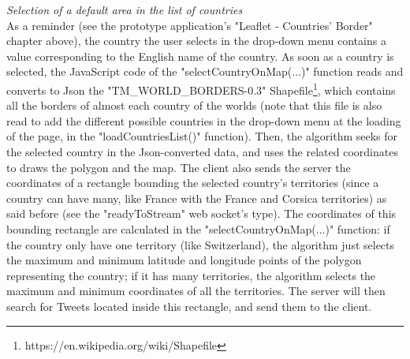 \documentclass[a4paper,11pt]{report}
\begin{document}
\emph{Selection of a default area in the list of countries}\\
As a reminder (see the prototype application's
"Leaflet - Countries' Border" chapter above), the country the user selects in the drop-down menu contains a value corresponding to the English name of the country. As soon as a country is selected, the JavaScript code of the "selectCountryOnMap(...)" function reads and converts to Json the "TM\_WORLD\_BORDERS-0.3" Shapefile\footnote{https://en.wikipedia.org/wiki/Shapefile}, which contains all the borders of almost each country of the worlds (note that this file is also read to add the different possible countries in the drop-down menu at the loading of the page, in the "loadCountriesList()" function). Then, the algorithm seeks for the selected country in the Json-converted data, and uses the related coordinates to draws the polygon and the map. The client also sends the server the coordinates of a rectangle bounding the selected country's territories (since a country can have many, like France with the France and Corsica territories) as said before (see the "readyToStream" web socket's type). The coordinates of this bounding rectangle are calculated in the "selectCountryOnMap(...)" function: if the country only have one territory (like Switzerland), the algorithm just selects the maximum and minimum latitude and longitude points of the polygon representing the country; if it has many territories, the algorithm selects the maximum and minimum coordinates of all the territories. The server will then search for Tweets located inside this rectangle, and send them to the client.\\
\end{document}
